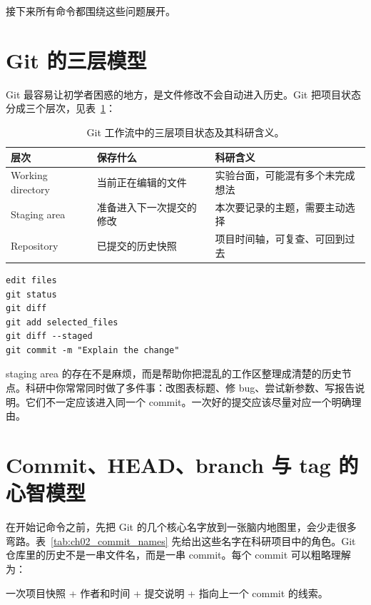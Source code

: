 接下来所有命令都围绕这些问题展开。

\section{Git 的三层模型}

Git 最容易让初学者困惑的地方，是文件修改不会自动进入历史。Git 把项目状态分成三个层次，见表~\ref{tab:ch02_git_layers}：

\begin{table}[htbp]
\centering
\begin{tabular}{p{}p{}p{}}
\toprule
层次 & 保存什么 & 科研含义 \\
\midrule
Working directory & 当前正在编辑的文件 & 实验台面，可能混有多个未完成想法 \\
Staging area & 准备进入下一次提交的修改 & 本次要记录的主题，需要主动选择 \\
Repository & 已提交的历史快照 & 项目时间轴，可复查、可回到过去 \\
\bottomrule
\end{tabular}
\caption{Git 工作流中的三层项目状态及其科研含义。}
\label{tab:ch02_git_layers}
\end{table}

\begin{examplebox}
\begin{lstlisting}[style=terminal]
edit files
git status
git diff
git add selected_files
git diff --staged
git commit -m "Explain the change"
\end{lstlisting}
\end{examplebox}

staging area 的存在不是麻烦，而是帮助你把混乱的工作区整理成清楚的历史节点。科研中你常常同时做了多件事：改图表标题、修 bug、尝试新参数、写报告说明。它们不一定应该进入同一个 commit。一次好的提交应该尽量对应一个明确理由。

\section{Commit、HEAD、branch 与 tag 的心智模型}

在开始记命令之前，先把 Git 的几个核心名字放到一张脑内地图里，会少走很多弯路。表~\ref{tab:ch02_commit_names} 先给出这些名字在科研项目中的角色。Git 仓库里的历史不是一串文件名，而是一串 commit。每个 commit 可以粗略理解为：

\begin{center}
一次项目快照 + 作者和时间 + 提交说明 + 指向上一个 commit 的线索。
\end{center}

